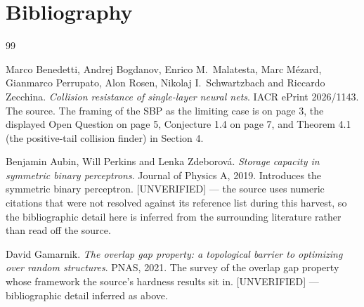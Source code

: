 \documentclass{aicr-conjecture}
\begin{document}
\section{Bibliography}

\begin{aicrbibliography}{99}

Marco Benedetti, Andrej Bogdanov, Enrico M.\ Malatesta, Marc M\'ezard,
Gianmarco Perrupato, Alon Rosen, Nikolaj I.\ Schwartzbach and Riccardo
Zecchina.
\emph{Collision resistance of single-layer neural nets}.
IACR ePrint 2026/1143.
The source. The framing of the SBP as the limiting case is on page 3, the
displayed Open Question on page 5, Conjecture 1.4 on page 7, and
Theorem 4.1 (the positive-tail collision finder) in Section 4.

Benjamin Aubin, Will Perkins and Lenka Zdeborov\'a.
\emph{Storage capacity in symmetric binary perceptrons}.
Journal of Physics A, 2019.
Introduces the symmetric binary perceptron. [UNVERIFIED] --- the source
uses numeric citations that were not resolved against its reference list
during this harvest, so the bibliographic detail here is inferred from the
surrounding literature rather than read off the source.

David Gamarnik.
\emph{The overlap gap property: a topological barrier to optimizing over
random structures}.
PNAS, 2021.
The survey of the overlap gap property whose framework the source's
hardness results sit in. [UNVERIFIED] --- bibliographic detail inferred as
above.

\end{aicrbibliography}
\end{document}
